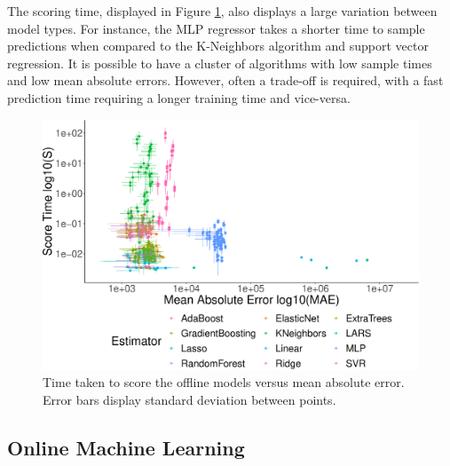 \documentclass[final,3p,times,twocolumn,numbers]{elsarticle}
\begin{document}
The scoring time, displayed in Figure \ref{fig:offline_score_time_vs_mae}, also displays a large variation between model types. For instance, the MLP regressor takes a shorter time to sample predictions when compared to the K-Neighbors algorithm and support vector regression. It is possible to have a cluster of algorithms with low sample times and low mean absolute errors. However, often a trade-off is required, with a fast prediction time requiring a longer training time and vice-versa. 



\begin{figure}[h]
\centering
\includegraphics[width=\columnwidth]{figures/results/offline_score_time_vs_mae_all_results_opaque.eps}
\caption{Time taken to score the offline models versus mean absolute error. Error bars display standard deviation between points.}
\label{fig:offline_score_time_vs_mae}
\end{figure}









\subsection{Online Machine Learning}
\end{document}
